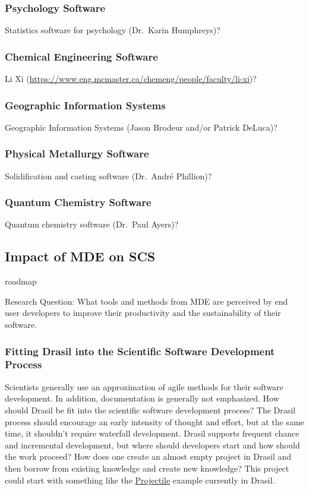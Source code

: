 \documentclass[12pt]{article}
\begin{document}
\subsubsection{Psychology Software}

Statistics software for psychology (Dr.\ Karin Humphreys)?

\subsubsection{Chemical Engineering Software}

Li Xi (\url{https://www.eng.mcmaster.ca/chemeng/people/faculty/li-xi})?

\subsubsection{Geographic Information Systems}

Geographic Information Systems (Jason Brodeur and/or Patrick DeLuca)?

\subsubsection{Physical Metallurgy Software}

Solidification and casting software (Dr.\ Andr\'e Phillion)?

\subsubsection{Quantum Chemistry Software}

Quantum chemistry software (Dr.\ Paul Ayers)?

\subsection{Impact of MDE on SCS} \label{SecImpactMDE}

roadmap

Research Question: What tools and methods from MDE are perceived by end user developers to
  improve their productivity and the sustainability of their software.

\subsubsection{Fitting Drasil into the Scientific Software Development Process} \label{Sec}

Scientists generally use an approximation of agile methods for their software
development.  In addition, documentation is generally not emphasized.  How
should Drasil be fit into the scientific software development process?  The
Drasil process should encourage an early intensity of thought and effort, but at
the same time, it shouldn't require waterfall development.  Drasil supports
frequent chance and incremental development, but where should developers start
and how should the work proceed?  How does one create an almost empty project in
Drasil and then borrow from existing knowledge and create new knowledge?  This
project could start with something like the
\href{https://jacquescarette.github.io/Drasil/examples/Projectile/srs/Projectile_SRS.html}
{Projectile} example currently in Drasil.
\end{document}
